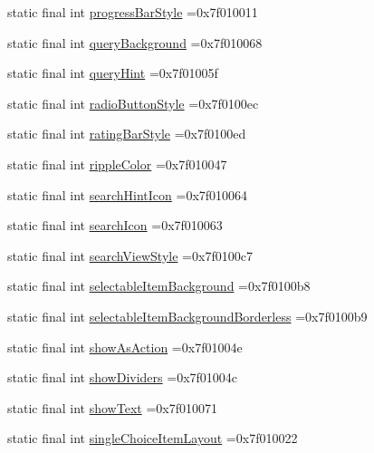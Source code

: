 \begin{DoxyCompactItemize}
\item 
static final int \hyperlink{classcheck_1_1test_1_1_r_1_1attr_afe708c30f6626b84484aba801cab4255}{progress\+Bar\+Style} =0x7f010011
\item 
static final int \hyperlink{classcheck_1_1test_1_1_r_1_1attr_af0a91bf09811eeb964bf4bbeda503819}{query\+Background} =0x7f010068
\item 
static final int \hyperlink{classcheck_1_1test_1_1_r_1_1attr_a6be50aa8a3f5405bbcce9d6d866f3b97}{query\+Hint} =0x7f01005f
\item 
static final int \hyperlink{classcheck_1_1test_1_1_r_1_1attr_a9fbb336c43ad1f66e9f652efbc698b91}{radio\+Button\+Style} =0x7f0100ec
\item 
static final int \hyperlink{classcheck_1_1test_1_1_r_1_1attr_a3caadf9d3a45df85bdd838e0a04dd32e}{rating\+Bar\+Style} =0x7f0100ed
\item 
static final int \hyperlink{classcheck_1_1test_1_1_r_1_1attr_aa48f9eb1277fc76c78ea6941a54f37f2}{ripple\+Color} =0x7f010047
\item 
static final int \hyperlink{classcheck_1_1test_1_1_r_1_1attr_aed7f407928079e9b1f426217289de596}{search\+Hint\+Icon} =0x7f010064
\item 
static final int \hyperlink{classcheck_1_1test_1_1_r_1_1attr_a717dce7ca09db8fdf5d59a56a1a70ee0}{search\+Icon} =0x7f010063
\item 
static final int \hyperlink{classcheck_1_1test_1_1_r_1_1attr_a8569118fa0ad9dc50ad2d3035e843862}{search\+View\+Style} =0x7f0100c7
\item 
static final int \hyperlink{classcheck_1_1test_1_1_r_1_1attr_afdec924c5188046ffd8cdee0a3aa3ca0}{selectable\+Item\+Background} =0x7f0100b8
\item 
static final int \hyperlink{classcheck_1_1test_1_1_r_1_1attr_a62db15ed42075eacd557934728d69a02}{selectable\+Item\+Background\+Borderless} =0x7f0100b9
\item 
static final int \hyperlink{classcheck_1_1test_1_1_r_1_1attr_a696ac4659352897d9af0044b2b9ecd16}{show\+As\+Action} =0x7f01004e
\item 
static final int \hyperlink{classcheck_1_1test_1_1_r_1_1attr_a750aa097ff8cb566f4d3df74241890b9}{show\+Dividers} =0x7f01004c
\item 
static final int \hyperlink{classcheck_1_1test_1_1_r_1_1attr_af5f8b91a69d2e2925fc0a7c41a279669}{show\+Text} =0x7f010071
\item 
static final int \hyperlink{classcheck_1_1test_1_1_r_1_1attr_adf3a7eab0f546f495a660d306b9f17fd}{single\+Choice\+Item\+Layout} =0x7f010022

\end{DoxyCompactItemize}
